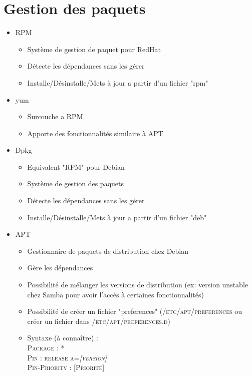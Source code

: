 \documentclass[a4paper]{article}
\begin{document}
    \section{Gestion des paquets}
    \begin{itemize}[label=\textbullet, font=\Large]
      \item RPM
      \begin{itemize}[label=, font=\scriptsize]
        \item Système de gestion de paquet pour RedHat
        \item Détecte les dépendances sans les gérer
        \item Installe/Désinstalle/Mets à jour a partir d'un fichier "rpm"
      \end{itemize}
      \item yum
      \begin{itemize}[label=, font=\scriptsize]
        \item Surcouche a RPM
        \item Apporte des fonctionnalités similaire à APT
      \end{itemize}
      \item Dpkg
      \begin{itemize}[label=, font=\scriptsize]
        \item Equivalent "RPM" pour Debian
        \item Système de gestion des paquets
        \item Détecte les dépendances sans les gérer
        \item Installe/Désinstalle/Mets à jour a partir d'un fichier "deb"
      \end{itemize}
      \item APT
      \begin{itemize}[label=, font=\scriptsize]
        \item Gestionnaire de paquets de distribution chez Debian
        \item Gère les dépendances
        \item Possibilité de mélanger les versions de distribution (ex: version unstable chez Samba pour avoir l'accès à certaines fonctionnalités)
        \item Possibilité de créer un fichier "preferences" (\textsc{/etc/apt/preferences} ou créer un fichier dans \textsc{/etc/apt/preferences.d})
        \item Syntaxe (à connaître) :\\\textsc{Package : *\\Pin : release a=\emph{[version]}\\Pin-Priority : [Priorité]}

\end{itemize}
\end{itemize}
\end{document}
